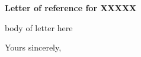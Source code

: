 \documentclass[a4paper]{letter}
\begin{document}
 
\begin{letter} 


 
 
 \vspace{-4cm}

\opening{ }

\medskip 
\centerline{\bf Letter of reference for   XXXXX} 
\medskip 



body of letter here     
 
\closing{Yours sincerely,} 
\end{letter} 
\end{document}
